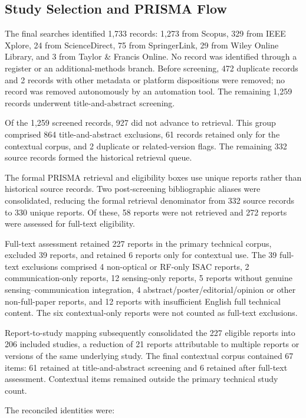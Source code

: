 \subsection{Study Selection and PRISMA Flow}
\label{subsec:prisma_flow_results}

The final searches identified 1,733 records: 1,273 from Scopus, 329 from IEEE
Xplore, 24 from ScienceDirect, 75 from SpringerLink, 29 from Wiley Online
Library, and 3 from Taylor \& Francis Online. No record was identified through
a register or an additional-methods branch. Before screening, 472 duplicate
records and 2 records with other metadata or platform dispositions were
removed; no record was removed autonomously by an automation tool. The
remaining 1,259 records underwent title-and-abstract screening.

Of the 1,259 screened records, 927 did not advance to retrieval. This group
comprised 864 title-and-abstract exclusions, 61 records retained only for the
contextual corpus, and 2 duplicate or related-version flags. The remaining 332
source records formed the historical retrieval queue.

The formal PRISMA retrieval and eligibility boxes use unique reports rather
than historical source records. Two post-screening bibliographic aliases were
consolidated, reducing the formal retrieval denominator from 332 source
records to 330 unique reports. Of these, 58 reports were not retrieved and 272
reports were assessed for full-text eligibility.

Full-text assessment retained 227 reports in the primary technical corpus,
excluded 39 reports, and retained 6 reports only for contextual use. The 39
full-text exclusions comprised 4 non-optical or RF-only ISAC reports, 2
communication-only reports, 12 sensing-only reports, 5 reports without genuine
sensing--communication integration, 4 abstract/poster/editorial/opinion or
other non-full-paper reports, and 12 reports with insufficient English full
technical content. The six contextual-only reports were not counted as
full-text exclusions.

Report-to-study mapping subsequently consolidated the 227 eligible reports
into 206 included studies, a reduction of 21 reports attributable to multiple
reports or versions of the same underlying study. The final contextual corpus
contained 67 items: 61 retained at title-and-abstract screening and 6 retained
after full-text assessment. Contextual items remained outside the primary
technical study count.

The reconciled identities were:

